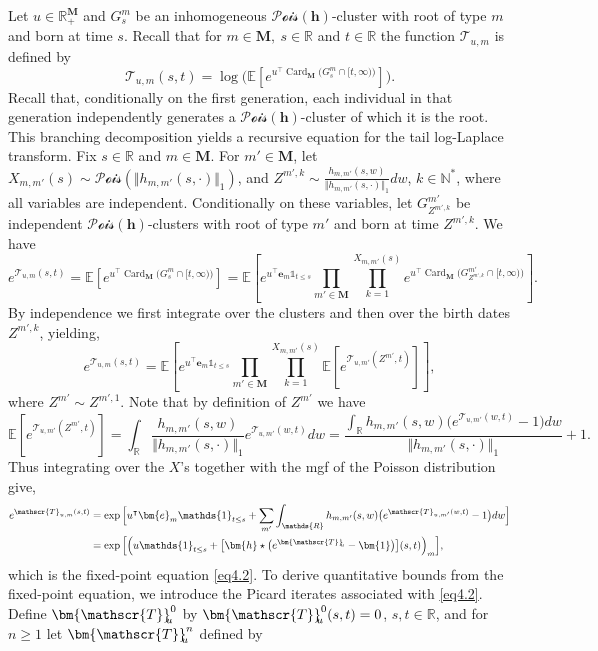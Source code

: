 \documentclass[reqno,final,11pt]{amsart}
\theoremstyle{plain}
\theoremstyle{definition}
\theoremstyle{remark}
\newcommand{\R}{\mathds{R}}
\newcommand{\N}{\mathds{N}}
\newcommand{\ind}{\mathds{1}}
\newcommand{\E}[1]{\mathds{E}\left[#1\right]}
\newcommand{\itg}{\displaystyle\int}
\newcommand{\M}{\bm{M}}
\newcommand{\ones}{\bm{1}}
\newcommand{\e}{\bm{e}}
\newcommand{\h}{\bm{h}}
\newcommand{\Ta}{\mathscr{T}}
\newcommand{\bTa}[1]{\bm{\mathscr{T}}_{\mkern-7mu #1}}
\newcommand{\pos}{\R_+^{\M}}
\newcommand{\Pois}{\mathscr{P}\!\mathscr{o}\!\mathscr{i}\!\mathscr{s}}
\newcommand{\trp}{^{\intercal}}
\DeclareMathOperator{\card}{Card}
\begin{document}
Let $u\in\pos$ and $G^{m}_{s}$ be an inhomogeneous $\Pois(\h)$-cluster with root of type $m$ and born at time $s$. Recall that for $m\in\M, \ s\in\R$ and $t\in\R$ the function $\Ta_{u,m}$ is defined by
    \[\Ta_{u,m}(s,t) = \log\Big( \E{e^{u\trp \card_{\M}\big(G^{m}_{s} \cap [t,\infty)\big)}} \Big).\]
    Recall that, conditionally on the first generation, each individual in that generation independently generates a $\Pois(\h)$-cluster of which it is the root. This branching decomposition yields a recursive equation for the tail log-Laplace transform.
    Fix $s\in\R$ and $m\in\M$. For $m'\in\M$, let $X_{m,m'}(s)\sim \Pois(\Vert h_{m,m'}(s,\cdot)\Vert_1)$, and $Z^{m',k}\sim \frac{h_{m,m'}(s,w)}{\Vert h_{m,m'}(s,\cdot)\Vert_1} dw$, $k\in\N^*$, where all variables are independent. Conditionally on these variables, let $G^{m'}_{Z^{m',k}}$ be independent $\Pois(\h)$-clusters with root of type $m'$ and born at time $Z^{m',k}$. We have    \begin{equation*}
        e^{\Ta_{u,m}(s,t)} = \E{e^{u\trp \card_{\M}\big(G^{m}_{s} \cap [t,\infty)\big)}}  = \E{e^{u\trp \e_m \ind_{t\leq s}} \prod_{m'\in\M} \prod_{k = 1}^{X_{m,m'}(s)} e^{u\trp \card_{\M}\big(G^{m'}_{Z^{m',k}}\cap[t,\infty)\big)}}.
    \end{equation*}
    By independence we first integrate over the clusters and then over the birth dates $Z^{m',k}$, yielding,
    \begin{equation*}
    	e^{\Ta_{u,m}(s,t)}  = \E{e^{u\trp \e_m \ind_{t\leq s}}\prod_{m'\in\M} \prod_{k = 1}^{X_{m,m'}(s)} \E{e^{\Ta_{u,m'}(Z^{m'},t)}}},
    \end{equation*}
    where $Z^{m'}\sim Z^{m',1}$. Note that by definition of $Z^{m'}$ we have
    \begin{equation*}
    	\E{e^{\Ta_{u,m'}(Z^{m'},t)}} = \itg_{\R} \frac{h_{m,m'}(s,w)}{\Vert h_{m,m'}(s,\cdot)\Vert_1} e^{\Ta_{u,m'}(w,t)} dw = \frac{\itg_{\R} h_{m,m'}(s,w) \big(e^{\Ta_{u,m'}(w,t)} -1\big) dw}{\Vert h_{m,m'}(s,\cdot)\Vert_1}+1.
    \end{equation*}
    Thus integrating over the $X$'s together with the mgf of the Poisson distribution give,
    \begin{align*}
        e^{\Ta_{u,m}(s,t)} & = \exp\Big[ u\trp \e_m \ind_{t\leq s} + \sum_{m'} \itg_{\R} h_{m,m'}(s,w) \big(e^{\Ta_{u,m'}(w,t)}-1\big) dw\Big]\\
        & = \exp\Big[ \Big(u \ind_{t\leq s} +\big[\h\star \big(e^{\bTa{u}}-\ones \big)\big](s,t)\Big)_{m}\Big],
    \end{align*}
    which is the fixed-point equation \eqref{eq4.2}. To derive quantitative bounds from the fixed-point equation, we introduce the Picard iterates associated with \eqref{eq4.2}. Define $\bTa{u}^0$ by $\bTa{u}^0(s,t) = 0$, $s,t\in\R$, and for $n\geq 1$ let $\bTa{u}^n$ defined by
\end{document}
